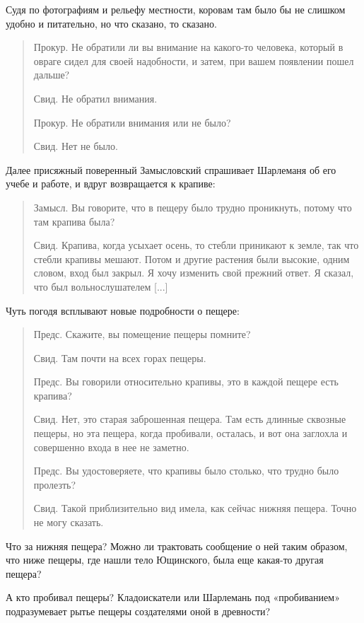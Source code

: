 Судя по фотографиям и рельефу местности, коровам там было бы не слишком удобно и питательно, но что сказано, то сказано.

\begin{quotation}
Прокур. Не обратили ли вы внимание на какого-то человека, который в овраге сидел для своей надобности, и затем, при вашем появлении пошел дальше?

Свид. Не обратил внимания.

Прокур. Не обратили внимания или не было?

Свид. Нет не было.
\end{quotation}

Далее присяжный поверенный Замысловский спрашивает Шарлеманя об его учебе и работе, и вдруг возвращается к крапиве:

\begin{quotation}
Замысл. Вы говорите, что в пещеру было трудно проникнуть, потому что там крапива была?

Свид. Крапива, когда усыхает осень, то стебли приникают к земле, так что стебли крапивы мешают. Потом и другие растения были высокие, одним словом, вход был закрыл. Я хочу изменить свой прежний ответ. Я сказал, что был вольнослушателем [...]
\end{quotation}

Чуть погодя всплывают новые подробности о пещере:

\begin{quotation}
Предс. Скажите, вы помещение пещеры помните?

Свид. Там почти на всех горах пещеры.

Предс. Вы говорили относительно крапивы, это в каждой пещере есть крапива?

Свид. Нет, это старая заброшенная пещера. Там есть длинные сквозные пещеры, но эта пещера, когда пробивали, осталась, и вот она заглохла и совершенно входа в нее не заметно.

Предс. Вы удостоверяете, что крапивы было столько, что трудно было пролезть?

Свид. Такой приблизительно вид имела, как сейчас нижняя пещера. Точно не могу сказать.\end{quotation}

Что за нижняя пещера? Можно ли трактовать сообщение о ней таким образом, что ниже пещеры, где нашли тело Ющинского, была еще какая-то другая пещера?

А кто пробивал пещеры? Кладоискатели или Шарлемань под «пробиванием» подразумевает рытье пещеры создателями оной в древности?

